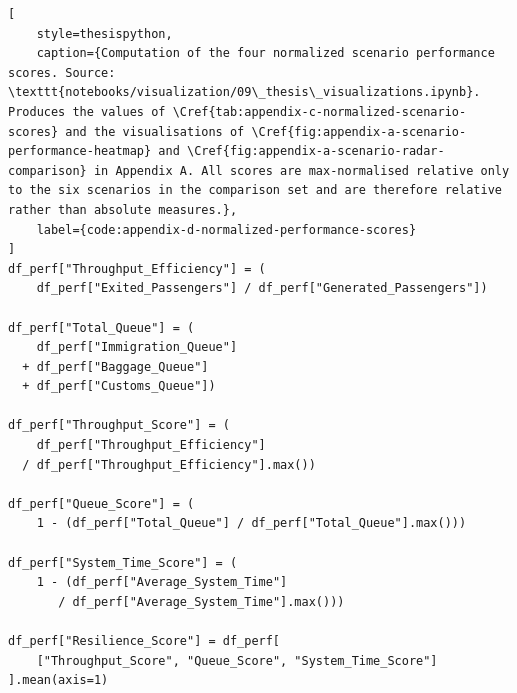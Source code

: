 \begin{lstlisting}[
    style=thesispython,
    caption={Computation of the four normalized scenario performance scores. Source: \texttt{notebooks/visualization/09\_thesis\_visualizations.ipynb}. Produces the values of \Cref{tab:appendix-c-normalized-scenario-scores} and the visualisations of \Cref{fig:appendix-a-scenario-performance-heatmap} and \Cref{fig:appendix-a-scenario-radar-comparison} in Appendix A. All scores are max-normalised relative only to the six scenarios in the comparison set and are therefore relative rather than absolute measures.},
    label={code:appendix-d-normalized-performance-scores}
]
df_perf["Throughput_Efficiency"] = (
    df_perf["Exited_Passengers"] / df_perf["Generated_Passengers"])

df_perf["Total_Queue"] = (
    df_perf["Immigration_Queue"]
  + df_perf["Baggage_Queue"]
  + df_perf["Customs_Queue"])

df_perf["Throughput_Score"] = (
    df_perf["Throughput_Efficiency"]
  / df_perf["Throughput_Efficiency"].max())

df_perf["Queue_Score"] = (
    1 - (df_perf["Total_Queue"] / df_perf["Total_Queue"].max()))

df_perf["System_Time_Score"] = (
    1 - (df_perf["Average_System_Time"]
       / df_perf["Average_System_Time"].max()))

df_perf["Resilience_Score"] = df_perf[
    ["Throughput_Score", "Queue_Score", "System_Time_Score"]
].mean(axis=1)
\end{lstlisting}

